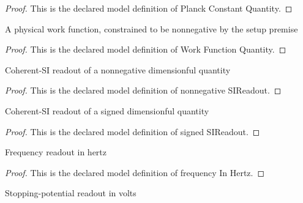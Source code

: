 \begin{proof}
  This is the declared model definition of Planck Constant Quantity.
\end{proof}
\begin{definition}
  \label{def:physics:phyx-mini-0498:phyxminiproblems-problemphyxmini0498-workfunctionquantity}
  A physical work function, constrained to be nonnegative by the setup premise
\end{definition}
\begin{proof}
  This is the declared model definition of Work Function Quantity.
\end{proof}
\begin{definition}
  \label{def:physics:phyx-mini-0498:phyxminiproblems-problemphyxmini0498-nonnegativesireadout}
  Coherent-SI readout of a nonnegative dimensionful quantity
\end{definition}
\begin{proof}
  This is the declared model definition of nonnegative SIReadout.
\end{proof}
\begin{definition}
  \label{def:physics:phyx-mini-0498:phyxminiproblems-problemphyxmini0498-signedsireadout}
  Coherent-SI readout of a signed dimensionful quantity
\end{definition}
\begin{proof}
  This is the declared model definition of signed SIReadout.
\end{proof}
\begin{definition}
  \label{def:physics:phyx-mini-0498:phyxminiproblems-problemphyxmini0498-frequencyinhertz}
  Frequency readout in hertz
\end{definition}
\begin{proof}
  This is the declared model definition of frequency In Hertz.
\end{proof}
\begin{definition}
  \label{def:physics:phyx-mini-0498:phyxminiproblems-problemphyxmini0498-potentialinvolts}
  Stopping-potential readout in volts
\end{definition}
